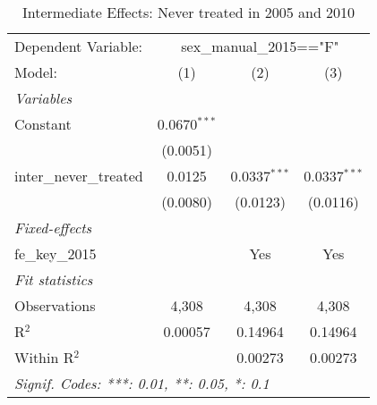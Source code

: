 
\begin{table}[htbp]
   \caption{Intermediate Effects: Never treated in 2005 and 2010}
   \centering
   \begin{tabular}{lccc}
      \tabularnewline \midrule \midrule
      Dependent Variable: & \multicolumn{3}{c}{sex\_manual\_2015=="F"}\\
      Model:                  & (1)            & (2)            & (3)\\  
      \midrule
      \emph{Variables}\\
      Constant                & 0.0670$^{***}$ &                &   \\   
                              & (0.0051)       &                &   \\   
      inter\_never\_treated   & 0.0125         & 0.0337$^{***}$ & 0.0337$^{***}$\\   
                              & (0.0080)       & (0.0123)       & (0.0116)\\   
      \midrule
      \emph{Fixed-effects}\\
      fe\_key\_2015           &                & Yes            & Yes\\  
      \midrule
      \emph{Fit statistics}\\
      Observations            & 4,308          & 4,308          & 4,308\\  
      R$^2$                   & 0.00057        & 0.14964        & 0.14964\\  
      Within R$^2$            &                & 0.00273        & 0.00273\\  
      \midrule \midrule
      \multicolumn{4}{l}{\emph{Signif. Codes: ***: 0.01, **: 0.05, *: 0.1}}\\
   \end{tabular}
\end{table}


